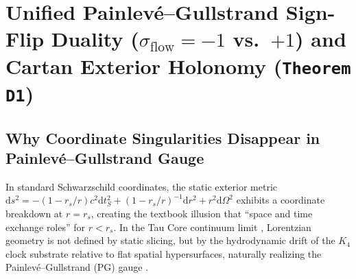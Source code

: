 \documentclass[11pt,a4paper]{article}
\theoremstyle{remark}
\begin{document}
\section{Unified Painlev\'e--Gullstrand Sign-Flip Duality (\texorpdfstring{$\sigma_{\mathrm{flow}} = -1$ vs.\ $+1$}{sigma\_flow = -1 vs. +1}) and Cartan Exterior Holonomy (\texttt{Theorem D1})}
\label{sec:duality}

\subsection{Why Coordinate Singularities Disappear in Painlev\'e--Gullstrand Gauge}

In standard Schwarzschild coordinates, the static exterior metric $\mathrm{d}s^2 = -(1 - r_s/r)c^2\mathrm{d}t_S^2 + (1 - r_s/r)^{-1}\mathrm{d}r^2 + r^2\mathrm{d}\Omega^2$ exhibits a coordinate breakdown at $r = r_s$, creating the textbook illusion that ``space and time exchange roles'' for $r < r_s$. In the Tau Core continuum limit \cite{JolcsakTauFoundationSeries2026}, Lorentzian geometry is not defined by static slicing, but by the hydrodynamic drift of the $K_4$ clock substrate relative to flat spatial hypersurfaces, naturally realizing the Painlev\'e--Gullstrand (PG) gauge \cite{Painleve1921,Gullstrand1922}.
\end{document}
